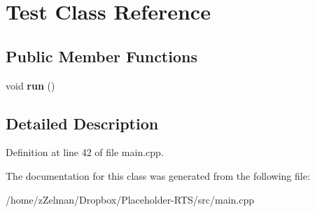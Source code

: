 \hypertarget{classTest}{\section{Test Class Reference}
\label{classTest}
}
\subsection*{Public Member Functions}
\begin{DoxyCompactItemize}
\item 
\hypertarget{classTest_abb64a8b970de8b2422b9f56cd8719ca4}{void {\bfseries run} ()}\label{classTest_abb64a8b970de8b2422b9f56cd8719ca4}

\end{DoxyCompactItemize}


\subsection{Detailed Description}


Definition at line 42 of file main.\-cpp.



The documentation for this class was generated from the following file\-:\begin{DoxyCompactItemize}
\item 
/home/z\-Zelman/\-Dropbox/\-Placeholder-\/\-R\-T\-S/src/main.\-cpp\end{DoxyCompactItemize}
